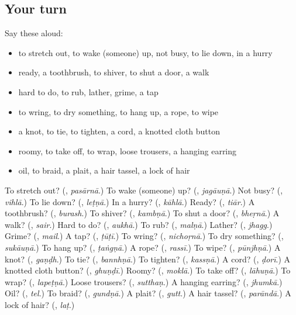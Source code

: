 \subsection*{Your turn}
Say these aloud:

\begin{itemize}
\raggedright
  \item to stretch out, to wake (someone) up, not busy, to lie down, in a hurry
  \item ready, a toothbrush, to shiver, to shut a door, a walk
  \item hard to do, to rub, lather, grime, a tap
  \item to wring, to dry something, to hang up, a rope, to wipe
  \item a knot, to tie, to tighten, a cord, a knotted cloth button
  \item roomy, to take off, to wrap, loose trousers, a hanging earring
  \item oil, to braid, a plait, a hair tassel, a lock of hair
\end{itemize}

\begin{tcolorbox}[breakable,colback=teal!4,colframe=teal!35!black,title={Before you move on}]
To stretch out? (\textbf{}, \emph{pasārnā}.) To wake (someone) up? (\textbf{}, \emph{jagāuṇā}.) Not busy? (\textbf{}, \emph{vihlā}.) To lie down? (\textbf{}, \emph{leṭṇā}.) In a hurry? (\textbf{}, \emph{kāhlā}.) Ready? (\textbf{}, \emph{tiār}.) A toothbrush? (\textbf{}, \emph{burash}.) To shiver? (\textbf{}, \emph{kambṇā}.) To shut a door? (\textbf{}, \emph{bheṛnā}.) A walk? (\textbf{}, \emph{sair}.) Hard to do? (\textbf{}, \emph{aukhā}.) To rub? (\textbf{}, \emph{malṇā}.) Lather? (\textbf{}, \emph{jhagg}.) Grime? (\textbf{}, \emph{mail}.) A tap? (\textbf{}, \emph{ṭūṭī}.) To wring? (\textbf{}, \emph{nichoṛnā}.) To dry something? (\textbf{}, \emph{sukāuṇā}.) To hang up? (\textbf{}, \emph{ṭaṅgṇā}.) A rope? (\textbf{}, \emph{rassī}.) To wipe? (\textbf{}, \emph{pūnjhṇā}.) A knot? (\textbf{}, \emph{gaṇḍh}.) To tie? (\textbf{}, \emph{bannhṇā}.) To tighten? (\textbf{}, \emph{kassṇā}.) A cord? (\textbf{}, \emph{ḍorī}.) A knotted cloth button? (\textbf{}, \emph{ghuṇḍī}.) Roomy? (\textbf{}, \emph{moklā}.) To take off? (\textbf{}, \emph{lāhuṇā}.) To wrap? (\textbf{}, \emph{lapeṭṇā}.) Loose trousers? (\textbf{}, \emph{sutthaṇ}.) A hanging earring? (\textbf{}, \emph{jhumkā}.) Oil? (\textbf{}, \emph{tel}.) To braid? (\textbf{}, \emph{gundṇā}.) A plait? (\textbf{}, \emph{gutt}.) A hair tassel? (\textbf{}, \emph{parāndā}.) A lock of hair? (\textbf{}, \emph{laṭ}.)
\end{tcolorbox}
